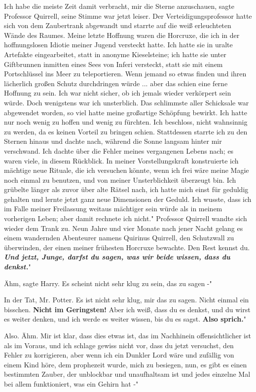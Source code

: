 \glqq Ich habe die meiste Zeit damit verbracht, mir die Sterne
anzuschauen\grqq{}, sagte Professor Quirrell, seine Stimme war jetzt leiser. Der
Verteidigungsprofessor hatte sich von dem Zaubertrank abgewandt und starrte auf
die weiß erleuchteten Wände des Raumes. \glqq Meine letzte Hoffnung waren die
Horcruxe, die ich in der hoffnungslosen Idiotie meiner Jugend versteckt hatte.
Ich hatte sie in uralte Artefakte eingearbeitet, statt in anonyme Kieselsteine;
ich hatte sie unter Giftbrunnen inmitten eines Sees von Inferi versteckt, statt
sie mit einem Portschlüssel ins Meer zu teleportieren. Wenn jemand so etwas
finden und ihren lächerlich großen Schutz durchdringen würde ... aber das schien
eine ferne Hoffnung zu sein. Ich war nicht sicher, ob ich jemals wieder
verkörpert sein würde. Doch wenigstens war ich unsterblich. Das schlimmste aller
Schicksale war abgewendet worden, so viel hatte meine großartige Schöpfung
bewirkt. Ich hatte nur noch wenig zu hoffen und wenig zu fürchten. Ich
beschloss, nicht wahnsinnig zu werden, da es keinen Vorteil zu bringen schien.
Stattdessen starrte ich zu den Sternen hinaus und dachte nach, während die Sonne
langsam hinter mir verschwand. Ich dachte über die Fehler meines vergangenen
Lebens nach; es waren viele, in diesem Rückblick. In meiner Vorstellungskraft
konstruierte ich mächtige neue Rituale, die ich versuchen könnte, wenn ich frei
wäre meine Magie noch einmal zu benutzen, und von meiner Unsterblichkeit
überzeugt bin. Ich grübelte länger als zuvor über alte Rätsel nach, ich hatte
mich einst für geduldig gehalten und lernte jetzt ganz neue Dimensionen der
Geduld. Ich wusste, dass ich im Falle meiner Freilassung weitaus mächtiger sein
würde als in meinem vorherigen Leben; aber damit rechnete ich nicht." Professor
Quirrell wandte sich wieder dem Trank zu. \glqq Neun Jahre und vier Monate nach
jener Nacht gelang es einem wandernden Abenteurer namens Quirinus Quirrell, den
Schutzwall zu überwinden, der einen meiner frühesten Horcruxe bewachte. Den Rest
kennst du. \textbf{\emph{Und jetzt, Junge, darfst du sagen, was wir beide
wissen, dass du denkst.}}"

\glqq Ähm\grqq{}, sagte Harry. \glqq Es scheint nicht sehr klug zu sein, das zu
sagen -"

\glqq In der Tat, Mr. Potter. Es ist nicht sehr klug, mir das zu sagen. Nicht
einmal ein bisschen. \textbf{Nicht im Geringsten!} Aber ich weiß, dass du es
denkst, und du wirst es weiter denken, und ich werde es weiter wissen, bis du es
sagst. \textbf{Also sprich.}"

\glqq Also. Ähm. Mir ist klar, dass dies etwas ist, das im Nachhinein
offensichtlicher ist als im Voraus, und ich schlage gewiss nicht vor, dass du
jetzt versuchst, den Fehler zu korrigieren, aber wenn ich ein Dunkler Lord wäre
und zufällig von einem Kind höre, dem prophezeit wurde, mich zu besiegen, nun,
es gibt es einen bestimmten Zauber, der unblockbar und unaufhaltsam ist und
jedes einzelne Mal bei allem funktioniert, was ein Gehirn hat -"

